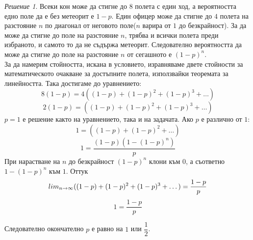 \documentclass[11 pt, a4paper]{article}
\theoremstyle{definition}
\newtheorem{p}{Задача}
\theoremstyle{remark}
\newtheorem*{s}{Решение}
\begin{document}
\begin{s}
Всеки кон може да стигне до $8$ полета с един ход, а вероятността едно поле да е без метеорит е $1-p$. Един офицер може да стигне до $4$ полета на разстояние $n$ по диагонал от неговото поле($n$ варира от $1$ до безкрайност). За да може да стигне до поле на разстояние $n$, трябва и всички полета преди избраното, и самото то да не съдържа метеорит. Следователно вероятността да може да стигне до поле на разстояние $n$ от сегашното е $(1-p)^n$.\\
За да намерим стойността, искана в условието, изравняваме двете стойности за математическото очакване за достъпните полета, използвайки теоремата за линейността. Така достигаме до уравнението:\\
\begin{equation*}
    8(1-p)=4((1-p)+(1-p)^2+(1-p)^3+\dots)
\end{equation*}
\begin{equation*}
2(1-p)=((1-p)+(1-p)^2+(1-p)^3+\dots)
\end{equation*}
$p=1$ е решение както на уравнението, така и на задачата. Ако $p$ е различно от $1$:
\begin{equation*}
1=((1-p)+(1-p)^2+\dots)
\end{equation*}
\begin{equation*}
1=\dfrac{(1-p)(1-(1-p)^n)}{p}
\end{equation*}
При нарастване на $n$ до безкрайност $(1-p)^n$ клони към $0$, а съответно $1-(1-p)^n$ към $1$. Оттук
\begin{equation*}
\\lim_{n\to\infty}((1-p)+(1-p)^2+(1-p)^3+\dots)=\dfrac{1-p}{p}
\end{equation*}
\begin{equation*}
1=\dfrac{1-p}{p}
\end{equation*}

Следователно окончателно $p$ е равно на $1$ или $\dfrac{1}{2}$.
\end{s}
\end{document}
